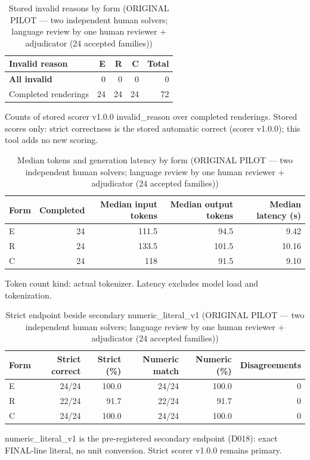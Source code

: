 \begin{table}[t]
\centering
\small
\caption{Stored invalid reasons by form (ORIGINAL PILOT --- two independent human solvers; language review by one human reviewer + adjudicator (24 accepted families))}
\label{tab:pilotorig-Qwen3-4B-invalid}
\begin{tabular}{lrrrr}
\toprule
Invalid reason & E & R & C & Total \\
\midrule
\textbf{All invalid} & 0 & 0 & 0 & 0 \\
Completed renderings & 24 & 24 & 24 & 72 \\
\bottomrule
\end{tabular}
\par\smallskip
\parbox{\linewidth}{\footnotesize Counts of stored scorer v1.0.0 invalid\_reason over completed renderings. Stored scores only: strict correctness is the stored automatic correct (scorer v1.0.0); this tool adds no new scoring.}
\end{table}

\begin{table}[t]
\centering
\small
\caption{Median tokens and generation latency by form (ORIGINAL PILOT --- two independent human solvers; language review by one human reviewer + adjudicator (24 accepted families))}
\label{tab:pilotorig-Qwen3-4B-resources}
\begin{tabular}{lrrrr}
\toprule
Form & Completed & Median input tokens & Median output tokens & Median latency (s) \\
\midrule
E & 24 & 111.5 & 94.5 & 9.42 \\
R & 24 & 133.5 & 101.5 & 10.16 \\
C & 24 & 118 & 91.5 & 9.10 \\
\bottomrule
\end{tabular}
\par\smallskip
\parbox{\linewidth}{\footnotesize Token count kind: actual tokenizer. Latency excludes model load and tokenization.}
\end{table}

\begin{table}[t]
\centering
\small
\caption{Strict endpoint beside secondary numeric\_literal\_v1 (ORIGINAL PILOT --- two independent human solvers; language review by one human reviewer + adjudicator (24 accepted families))}
\label{tab:pilotorig-Qwen3-4B-numeric}
\begin{tabular}{lrrrrr}
\toprule
Form & Strict correct & Strict (\%) & Numeric match & Numeric (\%) & Disagreements \\
\midrule
E & 24/24 & 100.0 & 24/24 & 100.0 & 0 \\
R & 22/24 & 91.7 & 22/24 & 91.7 & 0 \\
C & 24/24 & 100.0 & 24/24 & 100.0 & 0 \\
\bottomrule
\end{tabular}
\par\smallskip
\parbox{\linewidth}{\footnotesize numeric\_literal\_v1 is the pre-registered secondary endpoint (D018): exact FINAL-line literal, no unit conversion. Strict scorer v1.0.0 remains primary.}
\end{table}
